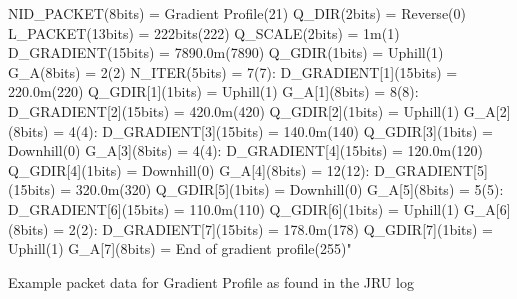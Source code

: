 \documentclass{template/openetcs_article}
\begin{document}
\begin{table}
  \footnotesize\sffamily
NID\_PACKET(8bits) = Gradient Profile(21)\newline
Q\_DIR(2bits) = Reverse(0)\newline
L\_PACKET(13bits) = 222bits(222)\newline
Q\_SCALE(2bits) = 1m(1)\newline
D\_GRADIENT(15bits) = 7890.0m(7890)\newline
Q\_GDIR(1bits) = Uphill(1)\newline
G\_A(8bits) = 2\textperthousand(2)\newline
N\_ITER(5bits) = 7(7): D\_GRADIENT[1](15bits) = 220.0m(220)\newline
        Q\_GDIR[1](1bits) = Uphill(1)\newline
        G\_A[1](8bits) = 8\textperthousand(8): D\_GRADIENT[2](15bits) = 420.0m(420)\newline
        Q\_GDIR[2](1bits) = Uphill(1)\newline
        G\_A[2](8bits) = 4\textperthousand(4): D\_GRADIENT[3](15bits) = 140.0m(140)\newline
        Q\_GDIR[3](1bits) = Downhill(0)\newline
        G\_A[3](8bits) = 4\textperthousand(4): D\_GRADIENT[4](15bits) = 120.0m(120)\newline
        Q\_GDIR[4](1bits) = Downhill(0)\newline
        G\_A[4](8bits) = 12\textperthousand(12): D\_GRADIENT[5](15bits) = 320.0m(320)\newline
        Q\_GDIR[5](1bits) = Downhill(0)\newline
        G\_A[5](8bits) = 5\textperthousand(5): D\_GRADIENT[6](15bits) = 110.0m(110)\newline
        Q\_GDIR[6](1bits) = Uphill(1)\newline
        G\_A[6](8bits) = 2\textperthousand(2): D\_GRADIENT[7](15bits) = 178.0m(178)\newline
        Q\_GDIR[7](1bits) = Uphill(1)\newline
        G\_A[7](8bits) = End of gradient profile(255)"\newline
\caption{Example packet data for Gradient Profile as found in the JRU log}
  \label{tab:p21}
\end{table}
\end{document}
